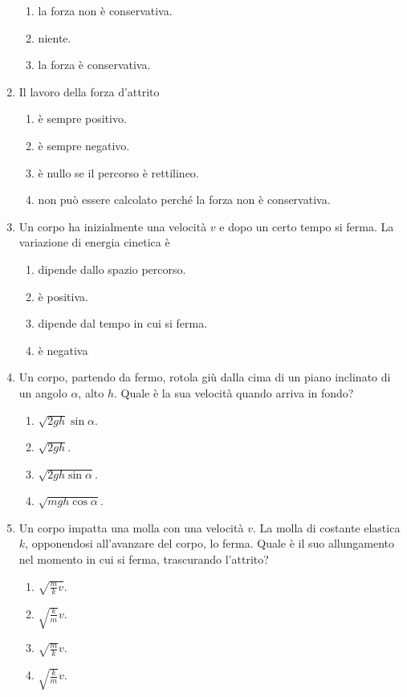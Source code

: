 \documentclass{article}
\begin{document}
\begin{enumerate}
\begin{enumerate}[label=\Alph*.]
    \item la forza non è conservativa.
    \item niente.
    \item la forza è conservativa.
  \end{enumerate}
  \item Il lavoro della forza d'attrito
  \begin{enumerate}[label=\Alph*.]
    \item è sempre positivo.
    \item è sempre negativo.
    \item è nullo se il percorso è rettilineo.
    \item non può essere calcolato perché la forza non è conservativa.
  \end{enumerate}
  \item Un corpo ha inizialmente una velocità $v$ e dopo un certo tempo si ferma. La variazione di energia cinetica è
  \begin{enumerate}[label=\Alph*.]
    \item dipende dallo spazio percorso.
    \item è positiva.
    \item dipende dal tempo in cui si ferma.
    \item è negativa
  \end{enumerate}
  \item Un corpo, partendo da fermo, rotola giù dalla cima di un piano inclinato di un angolo $\alpha$, alto $h$. Quale è la sua velocità quando arriva in fondo?
  \begin{enumerate}[label=\Alph*.]
    \item $\sqrt{2gh}\sin\alpha$.
    \item $\sqrt{2gh}$.
    \item $\sqrt{2gh\sin\alpha}$.
    \item $\sqrt{mgh\cos\alpha}$.
  \end{enumerate}
  \item Un corpo impatta una molla con una velocità $v$. La molla di costante elastica $k$, opponendosi all'avanzare del corpo, lo ferma. Quale è il suo allungamento nel momento in cui si ferma, trascurando l'attrito?
  \begin{enumerate}[label=\Alph*.]
    \item $\sqrt{\frac{m}{k}v}$.
    \item $\sqrt{\frac{k}{m}}v$.
    \item $\sqrt{\frac{m}{k}}v$.
    \item $\sqrt{\frac{k}{m}}v$.

\end{enumerate}
\end{enumerate}
\end{document}
